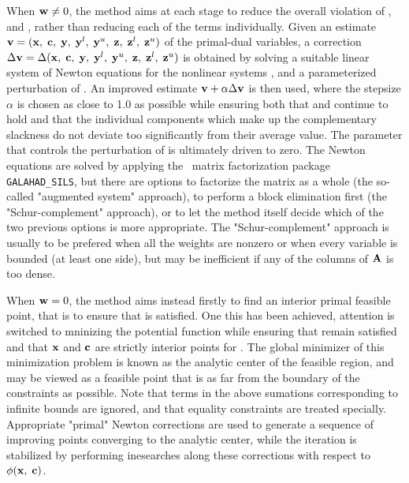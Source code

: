 \documentclass{galahad}
\begin{document}
When ${\mathbf{w}} \neq 0$, the method aims at each stage to reduce the
overall violation of ,  and , 
rather than reducing each of the terms individually. Given an estimate 
${\mathbf{v}} = ({\mathbf{x}}, \; {\mathbf{c}}, \; {\mathbf{y}}, \; {\mathbf{y}}^{l}, \;
{\mathbf{y}}^{u}, \; {\mathbf{z}}, \; {\mathbf{z}}^{l}, \; {\mathbf{z}}^{u})$
of the primal-dual variables, a correction
$\Delta {\mathbf{v}} = \Delta ({\mathbf{x}}, \; {\mathbf{c}}, \; {\mathbf{y}}, \; {\mathbf{y}}^{l},
 \; {\mathbf{y}}^{u} ,\;{\mathbf{z}},\;{\mathbf{z}}^{l} ,\;{\mathbf{z}}^{u} )$
is obtained by solving a suitable linear system of Newton equations for the
nonlinear systems ,  and a parameterized perturbation of 
. An improved estimate ${\mathbf{v}} + \alpha \Delta {\mathbf{v}}$ 
is then used, where the stepsize $\alpha$
is chosen as close to 1.0 as possible while ensuring both that
 and  continue to hold and that the individual components
which make up the complementary slackness 
 do not deviate too significantly
from their average value. The parameter that controls the perturbation
of  is ultimately driven to zero.
The Newton equations are solved  by applying the 
\galahad\ matrix factorization package 
{\tt GALAHAD\_SILS}, but there are options 
to factorize the matrix as a whole (the so-called "augmented system"
approach), to perform a block elimination first (the "Schur-complement"
approach), or to let the method itself decide which of the two
previous options is more appropriate.
The "Schur-complement" approach is usually to be prefered when all the
weights are nonzero or when every variable is bounded (at least one side),
but may be inefficient if any of the columns of ${\mathbf{A}}$ is too dense.

When ${\mathbf{w}} = 0$, the method aims instead firstly to find an interior 
primal feasible point, that is to ensure that  is satisfied. 
One this has been achieved, attention is switched to mninizing the
potential function
while ensuring that  remain satisfied and that 
${\mathbf{x}}$ and ${\mathbf{c}}$ are strictly interior points for . 
The global minimizer of this minimization problem is known as the
analytic center of the feasible region, and may be viewed as
a feasible point that is as far from the boundary of the constraints as 
possible.
Note that terms in the above sumations corresponding to infinite bounds are
ignored, and that equality constraints are treated specially.
Appropriate "primal" Newton corrections are used to generate a sequence
of improving points converging to the analytic center, while the iteration
is stabilized by performing inesearches along these corrections with respect to
$\phi ({\mathbf{x}},\;{\mathbf{c}})$.
\end{document}

